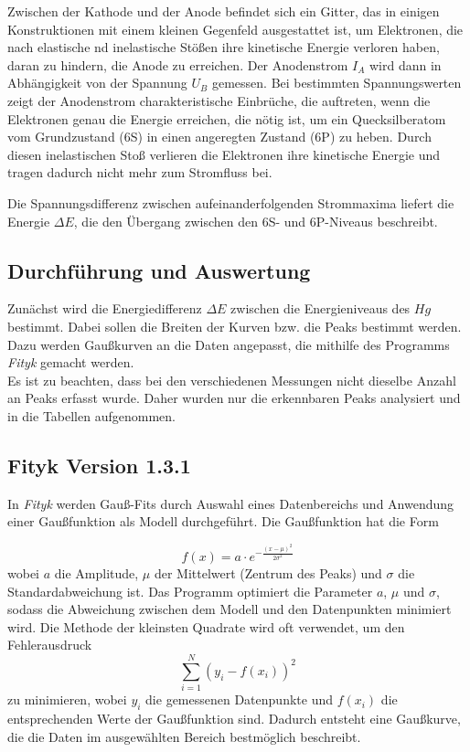 \documentclass{article}
\begin{document}
\begin{multicols}{2}
Zwischen der Kathode und der Anode befindet sich ein Gitter, das in einigen Konstruktionen mit einem kleinen 
Gegenfeld ausgestattet ist, um Elektronen, die nach elastische nd inelastische Stößen ihre kinetische Energie 
verloren haben, daran zu hindern, die Anode zu erreichen. Der Anodenstrom $I_A$
wird dann in Abhängigkeit von der Spannung $U_B$ gemessen. Bei bestimmten Spannungswerten zeigt der Anodenstrom charakteristische Einbrüche, die auftreten, wenn die Elektronen genau die Energie erreichen, die nötig ist, um ein Quecksilberatom vom Grundzustand (6S) in einen angeregten Zustand (6P) zu heben.
 Durch diesen inelastischen Stoß verlieren die Elektronen ihre kinetische Energie und tragen dadurch nicht mehr zum Stromfluss bei.

Die Spannungsdifferenz zwischen aufeinanderfolgenden Strommaxima liefert die Energie $\Delta E$, die den 
Übergang zwischen den 6S- und 6P-Niveaus beschreibt. 
\subsection{Durchführung und Auswertung}
Zunächst wird die Energiedifferenz $\Delta E$ zwischen die Energieniveaus des $Hg$ bestimmt. 
Dabei sollen die Breiten der Kurven bzw. die Peaks bestimmt werden. Dazu werden Gaußkurven an die Daten angepasst,
die mithilfe des Programms \textit{Fityk} gemacht werden.
\\ Es ist zu beachten, dass bei den verschiedenen Messungen nicht dieselbe Anzahl an Peaks 
erfasst wurde. Daher wurden nur die erkennbaren Peaks analysiert und in die Tabellen 
aufgenommen. 
\subsection*{Fityk Version 1.3.1}
In \textit{Fityk} werden Gauß-Fits durch Auswahl eines Datenbereichs und Anwendung einer Gaußfunktion als 
Modell durchgeführt. Die Gaußfunktion hat die Form 

\begin{equation*}
f(x) = a \cdot e^{-\frac{(x - \mu)^2}{2 \sigma^2}}
\end{equation*}
wobei $a$ die Amplitude, $\mu$ der Mittelwert (Zentrum des Peaks) und $\sigma$ die Standardabweichung 
ist. Das Programm optimiert die Parameter $a$, $\mu$ und $\sigma$, sodass die Abweichung zwischen dem Modell 
und den Datenpunkten minimiert wird. Die Methode der kleinsten Quadrate wird oft verwendet, um den
 Fehlerausdruck
\begin{equation*}
\sum_{i=1}^{N} (y_i - f(x_i))^2
\end{equation*}
zu minimieren, wobei $y_i$ die gemessenen Datenpunkte und $f(x_i)$ die entsprechenden Werte der Gaußfunktion 
sind. Dadurch entsteht eine Gaußkurve, die die Daten im ausgewählten Bereich bestmöglich beschreibt.

\end{multicols}
\end{document}
